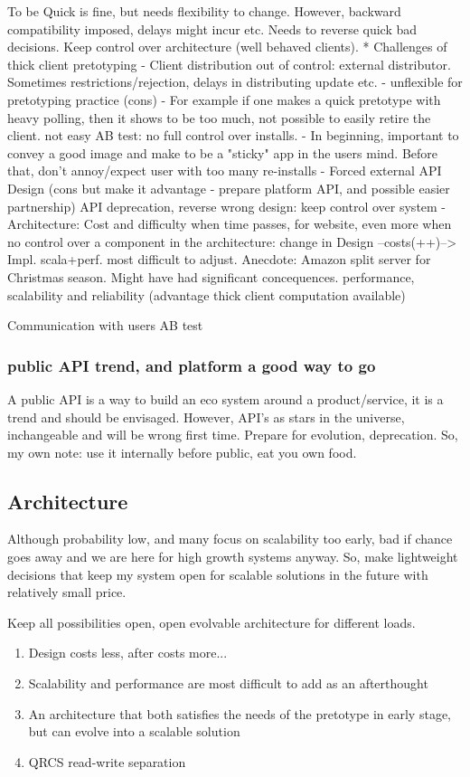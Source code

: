 \documentclass[a4paper,10pt]{article}
\begin{document}
To be Quick is fine, but needs flexibility to change. However, backward compatibility imposed, delays might incur etc.
Needs to reverse quick bad decisions. Keep control over architecture (well behaved clients).
 * Challenges of thick client pretotyping
 - Client distribution out of control: external distributor. Sometimes restrictions/rejection, delays in distributing update etc.
 - unflexible for pretotyping practice (cons)
    - For example if one makes a quick pretotype with heavy polling, then it shows to be too much, not possible to easily retire the client.
   not easy AB test: no full control over installs. 
 - In beginning, important to convey a good image and make to be a "sticky" app in the users mind. Before that, don't annoy/expect user
   with too many re-installs
 - Forced external API Design (cons but make it advantage - prepare platform API, and possible easier partnership)
    API deprecation, reverse wrong design: keep control over system
 - Architecture: 
    Cost and difficulty when time passes, for website, even more when no control over a component in the architecture:
      change in Design --costs(++)--> Impl.
      scala+perf. most difficult to adjust. Anecdote: Amazon split server for Christmas season. Might have had significant concequences.
    performance, scalability and reliability (advantage thick client computation available)


Communication with users
AB test

\subsubsection{public API trend, and platform a good way to go}
A public API is a way to build an eco system around a product/service, it is a trend and should be envisaged.
However, API's as stars in the universe, inchangeable and will be wrong first time.
Prepare for evolution, deprecation.
So, my own note: use it internally before public, eat you own food.

\subsection{Architecture}
Although probability low, and many focus on scalability too early, bad if chance goes away and we are here for high growth systems anyway.
So, make lightweight decisions that keep my system open for scalable solutions in the future with relatively small price.

Keep all possibilities open, open evolvable architecture for different loads.
\begin{enumerate}
\item Design costs less, after costs more...
\item Scalability and performance are most difficult to add as an afterthought
\item An architecture that both satisfies the needs of the pretotype in early stage, but can evolve
    into a scalable solution
\item QRCS read-write separation
\end{enumerate}
\end{document}
